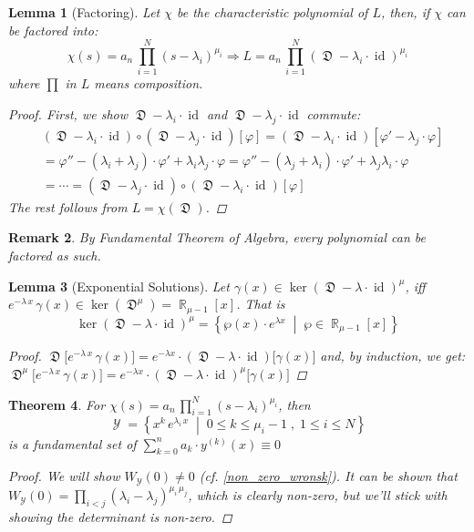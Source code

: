 \documentclass[12pt]{article}
\newcommand{\set}[2]{\left\{{#1}\;\middle|\;{#2}\right\}}
\DeclareMathOperator{\R}{\mathbb{R}}
\DeclareMathOperator{\Y}{\mathcal{Y}}
\DeclareMathOperator{\D}{\mathfrak{D}}
\DeclareMathOperator{\id}{id}
\newcommand{\der}[2][n]{{#2}^{(#1)}}
\newtheorem{theorem}{Theorem}[subsection]
\newtheorem{lemma}[theorem]{Lemma}
\newtheorem{remark}[theorem]{Remark}
\begin{document}
\begin{lemma}[Factoring]
  Let $\chi$ be the characteristic polynomial of $L$, then, if $\chi$ can be factored into: $$\chi(s)=a_n\,\prod_{i=1}^N(s-\lambda_i)^{\mu_i}\Rightarrow L=a_n\,\prod_{i=1}^N(\D-\lambda_i\cdot\id)^{\mu_i}$$ where $\prod$ in $L$ means composition.
  \begin{proof}
    First, we show $\D-\lambda_i\cdot\id$ and $\D-\lambda_j\cdot\id$ commute: 
    \begin{align*}
      &(\D-\lambda_i\cdot\id)\circ(\D-\lambda_j\cdot\id)[\varphi]=(\D-\lambda_i\cdot\id)[\varphi'-\lambda_j\cdot\varphi]\\
      &=\varphi''-(\lambda_i+\lambda_j)\cdot\varphi'+\lambda_i\lambda_j\cdot\varphi=\varphi''-(\lambda_j+\lambda_i)\cdot\varphi'+\lambda_j\lambda_i\cdot\varphi\\
      &=\cdots=(\D-\lambda_j\cdot\id)\circ(\D-\lambda_i\cdot\id)[\varphi]
    \end{align*}
    The rest follows from $L=\chi(\D)$.
  \end{proof}
\end{lemma}

\begin{remark}
  By Fundamental Theorem of Algebra, every polynomial can be factored as such.
\end{remark}

\begin{lemma}[Exponential Solutions]
  Let $\gamma(x)\in\ker(\D-\lambda\cdot\id)^\mu$, iff $e^{-\lambda\,x}\,\gamma(x)\in\ker(\D^\mu)=\R_{\mu-1}[x]$. That is $$\ker(\D-\lambda\cdot\id)^\mu=\set{\wp(x)\cdot e^{\lambda x}}{\wp\in\R_{\mu-1}[x]}$$
  \begin{proof}
    $\D\big[e^{-\lambda\,x}\,\gamma(x)\big]=e^{-\lambda x}\cdot(\D-\lambda\cdot\id)\big[\gamma(x)\big]$ and, by induction, we get: $\D^\mu\big[e^{-\lambda\,x}\,\gamma(x)\big]=e^{-\lambda x}\cdot(\D-\lambda\cdot\id)^\mu\big[\gamma(x)\big]$
  \end{proof}
\end{lemma}

\begin{theorem}
  \label{characteristic_solutions}
  For $\chi(s)=a_n\,\prod_{i=1}^N(s-\lambda_i)^{\mu_i}$, then $$\Y=\set{x^k\,e^{\lambda_i\,x}}{0\leq k\leq \mu_i-1\;,\;1\leq i\leq N}$$ is a fundamental set of $\sum_{k=0}^n a_k\cdot\der[k]{y}(x)\equiv 0$
  \begin{proof}
    We will show $W_{\Y}(0)\neq 0$ (cf. \ref{non_zero_wronsk}). It can be shown that $W_{\Y}(0)=\prod_{i<j}(\lambda_i-\lambda_j)^{\mu_i\,\mu_j}$, which is clearly non-zero, but we'll stick with showing the determinant is non-zero.
  \end{proof}
\end{theorem}
\end{document}
